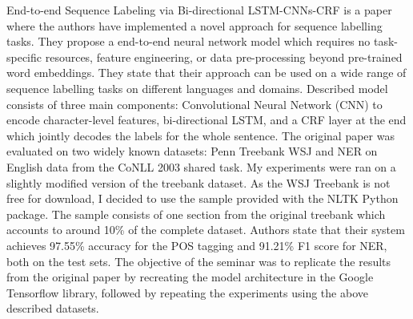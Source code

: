 End-to-end Sequence Labeling via Bi-directional LSTM-CNNs-CRF\cite{ma2016end} is a
paper where the authors have implemented a novel approach for sequence labelling tasks.
They propose a end-to-end neural network model which requires no task-specific
resources, feature engineering, or data pre-processing beyond pre-trained word
embeddings. They state that their approach can be used on a wide range of
sequence labelling tasks on different languages and domains. Described model
consists of three main components: Convolutional Neural Network
(CNN)\cite{lecun1989backpropagation} to encode character-level features, bi-directional
LSTM, and a CRF layer at the end which jointly decodes the labels
for the whole sentence. The original paper was evaluated on two widely known
datasets: Penn Treebank WSJ\cite{marcus1993building} and NER on English data
from the CoNLL 2003 shared task\cite{tjong2003introduction}. My experiments
were ran on a slightly
modified version of the treebank dataset. As the WSJ Treebank is not free for
download, I decided to use the sample provided with the NLTK Python
package\cite{bird2006nltk}. The sample consists of one section from the original
treebank which accounts to around 10\% of the complete dataset.
Authors state that their system achieves 97.55\% accuracy for the POS tagging
and 91.21\% F1 score for NER, both on the test sets. The objective of the seminar
was to replicate the results from the original paper by recreating the
model architecture in the Google Tensorflow library\cite{abadi2016tensorflow},
followed by repeating the experiments using the above described datasets.


